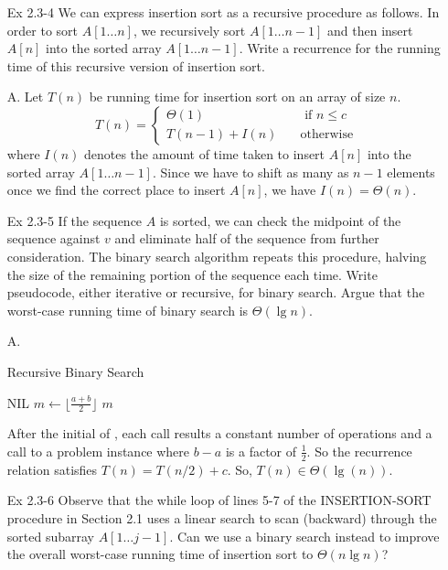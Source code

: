 \documentclass[fontsize=12pt,paper=a4]{book}
\begin{document}
\begin{enumerate}
			
	\item[Ex 2.3-4]
		We can express insertion sort as a recursive procedure as follows. In order to sort $A[1 \dots n]$, we recursively sort $A[1 \dots n-1]$ and then insert $A[n]$ into the sorted array $A[1 \dots n-1]$. Write a recurrence for the running time of this recursive version of insertion sort.
	\item[A.]
		Let $T(n)$ be running time for insertion sort on an array of size $n$.\\
		\[ T(n) = \begin{cases} \Theta(1) & \quad \text{ if $n \leq c$}\\
		T(n-1) + I(n) & \quad \text{otherwise}
		\end{cases} \]
		where $I(n)$ denotes the amount of time taken to insert $A[n]$ into the sorted array $A[1 \dots n-1]$. Since we have to shift as many as $n-1$ elements once we find the correct place to insert $A[n]$, we have $I(n) = \Theta(n)$.
			
	\item[Ex 2.3-5]
		If the sequence $A$ is sorted, we can check the midpoint of the sequence against $v$ and eliminate half of the sequence from further consideration. The binary search algorithm repeats this procedure, halving the size of the remaining portion of the sequence each time. Write pseudocode, either iterative or recursive, for binary search. Argue that the worst-case running time of binary search is $\Theta(\lg n)$.	
	\item[A.]
	\begin{algorithm}
		\caption{Recursive Binary Search}
		\begin{algorithmic}[1]
					\State \Return \textsc{NIL}
				\EndIf
				\State $m \gets \lfloor \frac{a+b}{2} \rfloor$
					\State \Return $m$
				\EndIf
					\State \Return {}
				\EndIf
				\State \Return {}
			\EndProcedure
		\end{algorithmic}
	\end{algorithm}
	
		After the initial of , each call results a constant number of operations and a call to a problem instance where $b-a$ is a factor of $\frac{1}{2}$. So the recurrence relation satisfies $T(n) = T(n/2) + c$. So, $T(n) \in \Theta(\lg(n))$.
		
	\item[Ex 2.3-6]
		Observe that the while loop of lines 5-7 of the INSERTION-SORT procedure in Section 2.1 uses a linear search to scan (backward) through the sorted subarray $A[1 \dots j-1]$. Can we use a binary search instead to improve the overall worst-case running time of insertion sort to $\Theta(n \lg n)$?
			

\end{enumerate}
\end{document}
